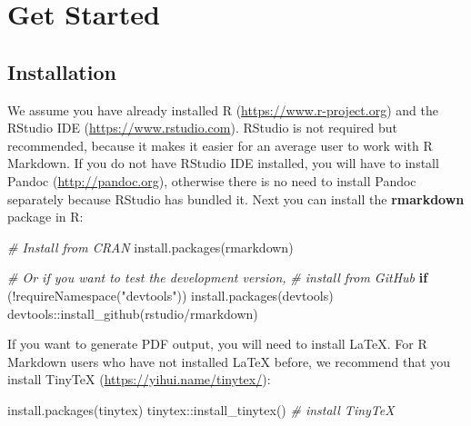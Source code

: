 \documentclass[
  11pt,
]{krantz}
\makeatletter
\newenvironment{Shaded}{\begin{snugshade}}{\end{snugshade}}
\newcommand{\CommentTok}[1]{\textcolor[rgb]{0.37,0.37,0.37}{\textit{#1}}}
\newcommand{\ControlFlowTok}[1]{\textcolor[rgb]{0.27,0.27,0.27}{\textbf{#1}}}
\newcommand{\FunctionTok}[1]{\textcolor[rgb]{0,0,0}{#1}}
\newcommand{\NormalTok}[1]{#1}
\newcommand{\SpecialCharTok}[1]{\textcolor[rgb]{0,0,0}{#1}}
\newcommand{\StringTok}[1]{\textcolor[rgb]{0.5,0.5,0.5}{#1}}
\newenvironment{kframe}{%
\medskip{}
\setlength{\fboxsep}{.8em}
 \def\at@end@of@kframe{}%
 \ifinner\ifhmode%
  \def\at@end@of@kframe{\end{minipage}}%
  \begin{minipage}{\columnwidth}%
 \fi\fi%
 \def\FrameCommand##1{\hskip\@totalleftmargin \hskip-\fboxsep
 \colorbox{shadecolor}{##1}\hskip-\fboxsep
     \hskip-\linewidth \hskip-\@totalleftmargin \hskip\columnwidth}%
 \MakeFramed {\advance\hsize-\width
   \@totalleftmargin\z@ \linewidth\hsize
   \@setminipage}}%
 {\par\unskip\endMakeFramed%
 \at@end@of@kframe}
\renewenvironment{Shaded}{\begin{kframe}}{\end{kframe}}
\theoremstyle{definition}
\theoremstyle{definition}
\theoremstyle{definition}
\theoremstyle{definition}
\theoremstyle{remark}
\makeatother
\begin{document}
\mainmatter

\hypertarget{part-get-started}{%
\part{Get Started}\label{part-get-started}}

\hypertarget{installation}{%
\chapter{Installation}\label{installation}}

We assume you have already installed R (\url{https://www.r-project.org}) \citep{R-base} and the RStudio IDE (\url{https://www.rstudio.com}). RStudio is not required but recommended, because it makes it easier for an average user to work with R Markdown. If you do not have RStudio IDE installed, you will have to install Pandoc (\url{http://pandoc.org}), otherwise there is no need to install Pandoc separately because RStudio has bundled it. Next you can install the \textbf{rmarkdown} package in R:

\begin{Shaded}
\begin{Highlighting}[]
\CommentTok{\# Install from CRAN}
\FunctionTok{install.packages}\NormalTok{(}\StringTok{\textquotesingle{}rmarkdown\textquotesingle{}}\NormalTok{)}

\CommentTok{\# Or if you want to test the development version,}
\CommentTok{\# install from GitHub}
\ControlFlowTok{if}\NormalTok{ (}\SpecialCharTok{!}\FunctionTok{requireNamespace}\NormalTok{(}\StringTok{"devtools"}\NormalTok{))}
  \FunctionTok{install.packages}\NormalTok{(}\StringTok{\textquotesingle{}devtools\textquotesingle{}}\NormalTok{)}
\NormalTok{devtools}\SpecialCharTok{::}\FunctionTok{install\_github}\NormalTok{(}\StringTok{\textquotesingle{}rstudio/rmarkdown\textquotesingle{}}\NormalTok{)}
\end{Highlighting}
\end{Shaded}

If you want to generate PDF output, you will need to install LaTeX. For R Markdown users who have not installed LaTeX before, we recommend that you install TinyTeX (\url{https://yihui.name/tinytex/}):

\begin{Shaded}
\begin{Highlighting}[]
\FunctionTok{install.packages}\NormalTok{(}\StringTok{\textquotesingle{}tinytex\textquotesingle{}}\NormalTok{)}
\NormalTok{tinytex}\SpecialCharTok{::}\FunctionTok{install\_tinytex}\NormalTok{()  }\CommentTok{\# install TinyTeX}
\end{Highlighting}
\end{Shaded}
\end{document}
